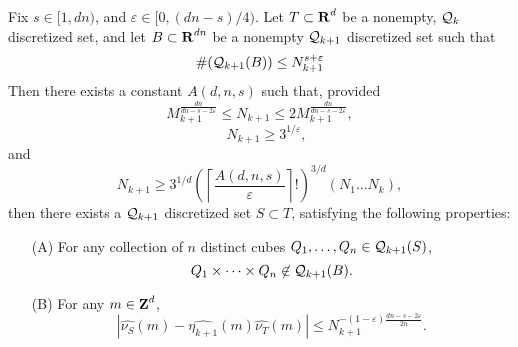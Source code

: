 
\begin{lemma} \label{discreteFourierBuildingBlock}
    Fix $s \in [1,dn)$, and $\varepsilon \in [0,(dn-s)/4)$. Let $T \subset \operatorname{\mathbf{R}}^d$ be a nonempty, $\operatorname{\mathcal{Q}}_k$ discretized set, and let $B \subset \operatorname{\mathbf{R}}^{dn}$ be a nonempty $\operatorname{\mathcal{Q}}_{k+1}$ discretized set such that
    \begin{equation} \label{equation982589128942189}
    \begin{split}
        \#(\operatorname{\mathcal{Q}}_{k+1}(B)) \leq N_{k+1}^{s + \varepsilon}
    \end{split}
    \end{equation}
    Then there exists a constant $A(d,n,s)$ such that, provided
    \begin{equation} \label{equation5523786128439}
        M_{k+1}^{\frac{dn}{dn - s - 2\varepsilon}} \leq N_{k+1} \leq 2 M_{k+1}^{\frac{dn}{dn - s - 2\varepsilon}},
    \end{equation}
    \begin{equation} \label{equation189248914891}
        \quad N_{k+1} \geq 3^{1/\varepsilon},
    \end{equation}
    and
    \begin{equation} \label{equation77871247817841278}
        N_{k+1} \geq 3^{1/d} \left( \left\lceil \frac{A(d,n,s)}{\varepsilon} \right\rceil! \right)^{3/d} (N_1 \dots N_k),
    \end{equation}
    then there exists a $\operatorname{\mathcal{Q}}_{k+1}$ discretized set $S \subset T$, satisfying the following properties:
    \begin{enumerate}
        \item[(A)] For any collection of $n$ distinct cubes $Q_1, \dots, Q_n \in \operatorname{\mathcal{Q}}_{k+1}(S)$,
        \[ Q_1 \times \dots \times Q_n \not \in \operatorname{\mathcal{Q}}_{k+1}(B). \]

        \item[(B)] For any $m \in \operatorname{\mathbf{Z}}^d$,
        \[ |\widehat{\nu_S}(m) - \widehat{\eta_{k+1}}(m) \widehat{\nu_T}(m)| \leq N_{k+1}^{-(1 - \varepsilon) \frac{dn - s - 2\varepsilon}{2n}}. \]
    \end{enumerate}
\end{lemma}
